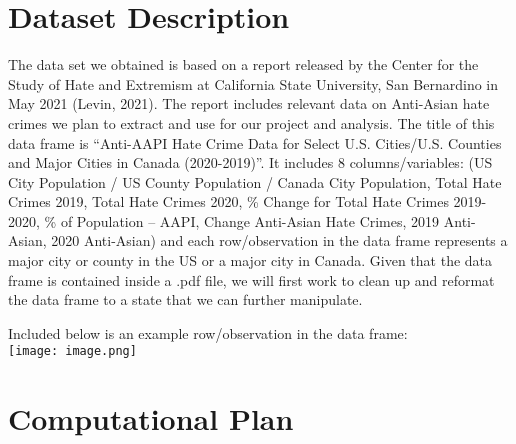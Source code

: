 \documentclass[fontsize=11pt]{article}
\begin{document}
    \section*{Dataset Description}

    The data set we obtained is based on a report released by the Center for the Study of Hate and Extremism at California State University, San Bernardino in May 2021 (Levin, 2021). The report includes relevant data on Anti-Asian hate crimes we plan to extract and use for our project and analysis. The title of this data frame is “Anti-AAPI Hate Crime Data for Select U.S. Cities/U.S. Counties and Major Cities in Canada (2020-2019)”. It includes 8 columns/variables: (US City Population / US County Population / Canada City Population, Total Hate Crimes 2019, Total Hate Crimes 2020, \% Change for Total Hate Crimes 2019-2020, \% of Population – AAPI, Change Anti-Asian Hate Crimes, 2019 Anti-Asian, 2020 Anti-Asian) and each row/observation in the data frame represents a major city or county in the US or a major city in Canada. Given that the data frame is contained inside a .pdf file, we will first work to clean up and reformat the data frame to a state that we can further manipulate.

    Included below is an example row/observation in the data frame:\\
    \texttt{[image: image.png]}

    \section*{Computational Plan}
\end{document}
